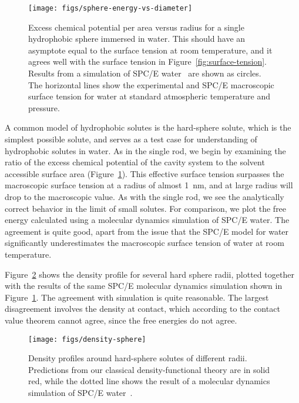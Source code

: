 \documentclass[twocolumn,amsmath,amssymb,prb]{revtex4-1}
\begin{document}
\begin{figure}
\begin{center}
\texttt{[image: figs/sphere-energy-vs-diameter]}
\end{center}
\caption{ Excess chemical potential per area versus radius for
  a single hydrophobic sphere
  immersed in water. This should have an asymptote equal to the
  surface tension at room temperature, and it agrees well with the
  surface tension in Figure~\ref{fig:surface-tension}. Results from a
  simulation of SPC/E water~\cite{huang2001shs} are shown as circles.
  The horizontal lines show the experimental and SPC/E macroscopic surface
  tension for water at standard atmospheric temperature and
  pressure. }
\label{fig:sphere-energy-vs-diameter}
\end{figure}

A common model of hydrophobic solutes is the hard-sphere solute, which
is the simplest possible solute, and serves as a test case for
understanding of hydrophobic solutes in
water\cite{sedlmeier2011entropy}.  As in the single rod, we begin by
examining the ratio of the excess chemical potential of the cavity
system to the solvent accessible surface area
(Figure~\ref{fig:sphere-energy-vs-diameter}).  This
effective surface tension surpasses the macroscopic surface tension at a
radius of almost 1~nm, and at large radius will drop to the macroscopic value.  As
with the single rod, we see the analytically correct behavior in the
limit of small solutes.  For comparison, we plot the free energy
calculated using a molecular dynamics simulation of SPC/E
water\cite{huang2001shs}.  The agreement is quite good, apart from the
issue that the SPC/E model for water significantly underestimates the
macroscopic surface tension of water at room
temperature\cite{vega2007surface}.

Figure~\ref{fig:density-sphere} shows the density profile for several
hard sphere radii, plotted together with the results of the same
SPC/E molecular dynamics simulation shown in
Figure~\ref{fig:sphere-energy-vs-diameter}\cite{huang2001shs}.  The
agreement with simulation is quite reasonable.  The largest
disagreement involves the density at contact, which according to the
contact value theorem cannot agree, since the free energies do not
agree.

\begin{figure}
\begin{center}
\texttt{[image: figs/density-sphere]}
\end{center}
\caption{ Density profiles around hard-sphere solutes of different radii. Predictions
  from our classical density-functional theory are in solid red, while
  the dotted line shows the result of a molecular dynamics simulation
  of SPC/E water~\cite{huang2001shs}.  }
\label{fig:density-sphere}
\end{figure}
\end{document}
